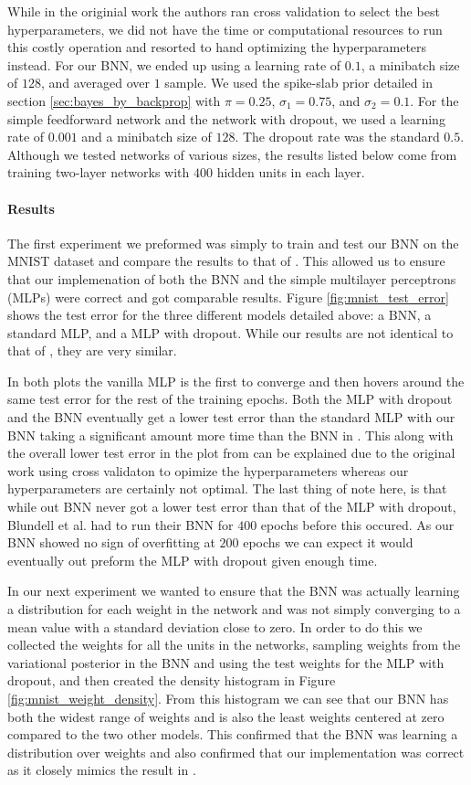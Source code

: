 \documentclass[11pt]{article}
\begin{document}
While in the originial work the authors ran cross validation to select the best
hyperparameters, we did not have the time or computational resources to run this
costly operation and resorted to hand optimizing the hyperparameters instead.
For our BNN, we ended up using a learning rate of $0.1$, a minibatch size of 
$128$, and averaged over $1$ sample. We used the spike-slab prior detailed in
section \ref{sec:bayes_by_backprop} with $\pi = 0.25$, $\sigma_1 = 0.75$, and 
$\sigma_2 = 0.1$. For the simple feedforward network and the network with 
dropout, we used a learning rate of $0.001$ and a minibatch size of $128$.
The dropout rate was the standard $0.5$. Although we tested networks of various
sizes, the results listed below come from training two-layer networks with
$400$ hidden units in each layer.

\paragraph{Results}
The first experiment we preformed was simply to train and test our BNN on the 
MNIST dataset and compare the results to that of \cite{blundell}. This allowed us
to ensure that our implemenation of both the BNN and the simple multilayer
perceptrons (MLPs) were correct and got comparable results. Figure
\ref{fig:mnist_test_error} shows the test error for the three different models
detailed above: a BNN, a standard MLP, and a MLP with dropout. While our 
results are not identical to that of \cite{blundell}, they are very similar. 

In both plots the vanilla MLP is the first to converge and then hovers around
the same test error for the rest of the training epochs. Both the MLP with
dropout and the BNN eventually get a lower test error than the standard MLP
with our BNN taking a significant amount more time than the BNN in 
\cite{blundell}. This along with the overall lower test error in the plot from
\cite {blundell} can be explained due to the original work using cross validaton
to opimize the hyperparameters whereas our hyperparameters are certainly not
optimal. The last thing of note here, is that while out BNN never got a lower
test error than that of the MLP with dropout, Blundell et al. had to run their
BNN for $400$ epochs before this occured. As our BNN showed no sign of 
overfitting at $200$ epochs we can expect it would eventually out preform the 
MLP with dropout given enough time.

In our next experiment we wanted to ensure that the BNN was actually learning 
a distribution for each weight in the network and was not simply converging to
a mean value with a standard deviation close to zero. In order to do this we
collected the weights for all the units in the networks, sampling weights 
from the variational posterior in the BNN and using the test weights for the 
MLP with dropout, and then created the density histogram in Figure 
\ref{fig:mnist_weight_density}. From this histogram we can see that our BNN
has both the widest range of weights and is also the least weights centered at
zero compared to the two other models. This confirmed that the BNN was learning
a distribution over weights and also confirmed that our implementation was 
correct as it closely mimics the result in \cite{blundell}.
\end{document}
